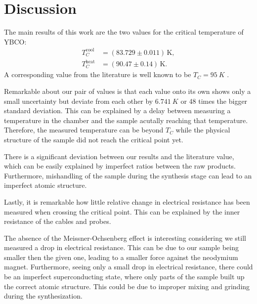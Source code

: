 \section{Discussion}
\label{sec:discussion}
The main results of this work are the two values for the critical temperature of YBCO:
\begin{align}
  T_C^\text{cool} &= (83.729 \pm 0.011) \, \text{K}, \\
  T_C^\text{heat} &= (90.47 \pm 0.14) \, \text{K}.
\end{align}
A corresponding value from the literature is well known to be $T_C = \SI{95}{K}$ \cite{19971173}.

Remarkable about our pair of values is that each value onto its own shows only a small uncertainty
but deviate from each other by $\SI{6.741}{K}$ or 48 times the bigger standard deviation. This can
be explained by a delay between measuring a temperature in the chamber and the sample acutally
reaching that temperature. Therefore, the measured temperature can be beyond $T_C$ while the
physical structure of the sample did not reach the critical point yet.

There is a significant deviation between our results and the literature value, which can be easily
explained by imperfect ratios between the raw products. Furthermore, mishandling of the sample
during the synthesis stage can lead to an imperfect atomic structure. 

Lastly, it is remarkable how little relative change in electrical resistance has been measured when
crossing the critical point. This can be explained by the inner resistance of the cables and probes.

The absence of the Meissner-Ochsenberg effect is interesting considering we still measured a drop in
electrical resistance. This can be due to our sample being smaller then the given one, leading to
a smaller force against the neodymium magnet. Furthermore, seeing only a small drop in electrical
resistance, there could be an imperfect superconducting state, where only parts of the sample built
up the correct atomic structure. This could be due to improper mixing and grinding during the
synthesization.

